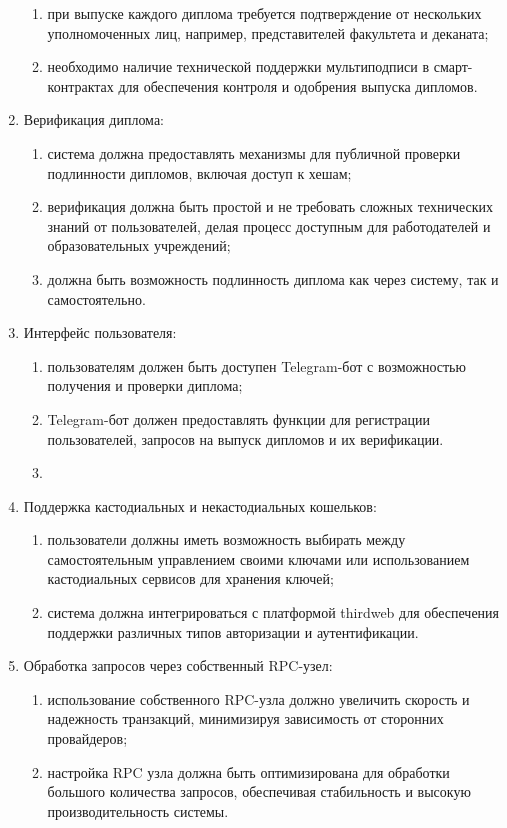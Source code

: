 \begin{enumerate}
    \begin{enumerate}
        \item при выпуске каждого диплома требуется подтверждение от нескольких уполномоченных лиц, например, представителей факультета и деканата;
        \item необходимо наличие технической поддержки мультиподписи в смарт-контрактах для обеспечения контроля и одобрения выпуска дипломов.
    \end{enumerate}
    \item Верификация диплома:
    \begin{enumerate}
        \item система должна предоставлять механизмы для публичной проверки подлинности дипломов, включая доступ к хешам;
        \item верификация должна быть простой и не требовать сложных технических знаний от пользователей, делая процесс доступным для работодателей и образовательных учреждений;
        \item должна быть возможность подлинность диплома как через систему, так и самостоятельно.
    \end{enumerate}
    \item Интерфейс пользователя:
    \begin{enumerate}
        \item пользователям должен быть доступен Telegram-бот с возможностью получения и проверки диплома;
        \item Telegram-бот должен предоставлять функции для регистрации пользователей, запросов на выпуск дипломов и их верификации.
        \item 
    \end{enumerate}
    \item Поддержка кастодиальных и некастодиальных кошельков:
    \begin{enumerate}
        \item пользователи должны иметь возможность выбирать между самостоятельным управлением своими ключами или использованием кастодиальных сервисов для хранения ключей;
        \item система должна интегрироваться с платформой thirdweb для обеспечения поддержки различных типов авторизации и аутентификации.
    \end{enumerate}
    \item Обработка запросов через собственный RPC-узел:
    \begin{enumerate}
        \item использование собственного RPC-узла должно увеличить скорость и надежность транзакций, минимизируя зависимость от сторонних провайдеров;
        \item настройка RPC узла должна быть оптимизирована для обработки большого количества запросов, обеспечивая стабильность и высокую производительность системы.
    \end{enumerate}
\end{enumerate}

